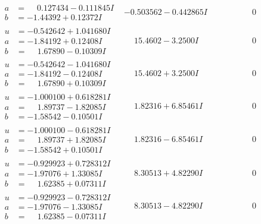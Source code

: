 \documentclass[1p]{elsarticle_modified}
\theoremstyle{definition}
\begin{document}
$$\begin{array}{c|c|c}
\begin{aligned}
a &= \phantom{-}0.127434 - 0.111845 I \\
b &= -1.44392 + 0.12372 I\end{aligned}
 & -0.503562 - 0.442865 I & \phantom{-0.000000 } 0 \\ \hline\begin{aligned}
u &= -0.542642 + 1.041680 I \\
a &= -1.84192 + 0.12408 I \\
b &= \phantom{-}1.67890 - 0.10309 I\end{aligned}
 & \phantom{-}15.4602 - 3.2500 I & \phantom{-0.000000 } 0 \\ \hline\begin{aligned}
u &= -0.542642 - 1.041680 I \\
a &= -1.84192 - 0.12408 I \\
b &= \phantom{-}1.67890 + 0.10309 I\end{aligned}
 & \phantom{-}15.4602 + 3.2500 I & \phantom{-0.000000 } 0 \\ \hline\begin{aligned}
u &= -1.000100 + 0.618281 I \\
a &= \phantom{-}1.89737 - 1.82085 I \\
b &= -1.58542 - 0.10501 I\end{aligned}
 & \phantom{-}1.82316 + 6.85461 I & \phantom{-0.000000 } 0 \\ \hline\begin{aligned}
u &= -1.000100 - 0.618281 I \\
a &= \phantom{-}1.89737 + 1.82085 I \\
b &= -1.58542 + 0.10501 I\end{aligned}
 & \phantom{-}1.82316 - 6.85461 I & \phantom{-0.000000 } 0 \\ \hline\begin{aligned}
u &= -0.929923 + 0.728312 I \\
a &= -1.97076 + 1.33085 I \\
b &= \phantom{-}1.62385 + 0.07311 I\end{aligned}
 & \phantom{-}8.30513 + 4.82290 I & \phantom{-0.000000 } 0 \\ \hline\begin{aligned}
u &= -0.929923 - 0.728312 I \\
a &= -1.97076 - 1.33085 I \\
b &= \phantom{-}1.62385 - 0.07311 I\end{aligned}
 & \phantom{-}8.30513 - 4.82290 I & \phantom{-0.000000 } 0 \\ \hline\begin{aligned}

\end{aligned}
\end{array}$$
\end{document}
